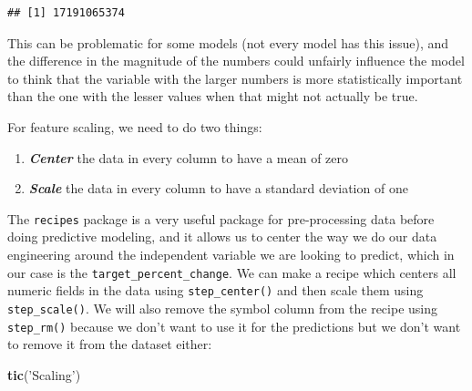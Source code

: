 \documentclass[
]{book}
\newenvironment{Shaded}{\begin{snugshade}}{\end{snugshade}}
\newcommand{\DataTypeTok}[1]{\textcolor[rgb]{0.13,0.29,0.53}{#1}}
\newcommand{\KeywordTok}[1]{\textcolor[rgb]{0.13,0.29,0.53}{\textbf{#1}}}
\newcommand{\NormalTok}[1]{#1}
\newcommand{\OperatorTok}[1]{\textcolor[rgb]{0.81,0.36,0.00}{\textbf{#1}}}
\newcommand{\StringTok}[1]{\textcolor[rgb]{0.31,0.60,0.02}{#1}}
\begin{document}
\begin{Shaded}
\end{Shaded}

\begin{verbatim}
## [1] 17191065374
\end{verbatim}

This can be problematic for some models (not every model has this issue), and the difference in the magnitude of the numbers could unfairly influence the model to think that the variable with the larger numbers is more statistically important than the one with the lesser values when that might not actually be true.

For feature scaling, we need to do two things:

\begin{enumerate}
\def\labelenumi{\arabic{enumi}.}
\item
  \textbf{\emph{Center}} the data in every column to have a mean of zero
\item
  \textbf{\emph{Scale}} the data in every column to have a standard deviation of one
\end{enumerate}

The \texttt{recipes} \citep{R-recipes} package is a very useful package for pre-processing data before doing predictive modeling, and it allows us to center the way we do our data engineering around the independent variable we are looking to predict, which in our case is the \texttt{target\_percent\_change}. We can make a recipe which centers all numeric fields in the data using \texttt{step\_center()} and then scale them using \texttt{step\_scale()}. We will also remove the symbol column from the recipe using \texttt{step\_rm()} because we don't want to use it for the predictions but we don't want to remove it from the dataset either:

\begin{Shaded}
\begin{Highlighting}[]
\KeywordTok{tic}\NormalTok{(}\StringTok{'Scaling'}\NormalTok{)}
\end{Highlighting}
\end{Shaded}

\begin{Shaded}
\end{Shaded}
\end{document}
